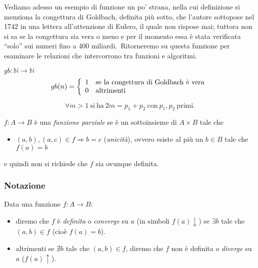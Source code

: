 \noindent Vediamo adesso un esempio di funzione un po' strana, nella cui definizione si menziona la congettura di Goldbach, definita più sotto, che l'autore sottopose nel 1742 in una lettera all'attenzione di Eulero, il quale non rispose mai; tuttora non si sa se la congettura sia vera o meno e per il momento essa è stata verificata ``solo'' sui numeri fino a 400 miliardi.\
Ritorneremo su questa funzione per esaminare le relazioni che intercorrono tra funzioni e algoritmi.

\begin{example}{\label{Goldbach}}
    $gb : \mathbb{N} \rightarrow \mathbb{N}$
    \[gb(n) = \left\{\begin{array}{l l}
            1 & \mathrm{se\ la\ congettura\ di\ Goldbach\ \grave{e}\ vera} \\
            0 & \mathrm{altrimenti}                                        \\
        \end{array}\right.\]
\end{example}

\begin{definition}
    \[\forall m > 1\ \mathrm{si\ ha}\ 2m = p_1 + p_2\ \mathrm{con}\ p_1, p_2\ \mathrm{primi}.\]
\end{definition}

\begin{definition}
    $f:A\rightarrow B$ è una \textit{funzione parziale} se è un sottoinsieme di $A \times B$ tale che
    \begin{itemize}
        \item $(a,b), (a,c) \in f \Rightarrow b = c$ (\textit{unicità}), ovvero esiste al più un $b \in B$ tale che $f(a)=b$
    \end{itemize}

    \noindent e quindi non si richiede che $f$ sia ovunque definita.
\end{definition}

\subsubsection{Notazione}

Data una funzione $f:A\rightarrow B$:

\begin{itemize}
    \item diremo che $f$ è \textit{definita} o \textit{converge} su $a$ (in simboli $f(a) \downarrow$) se $\exists b$ tale che $(a,b) \in f$ (cioè $f(a) = b$).
    \item altrimenti se $\nexists b$ tale che $(a,b)\in f$, diremo che $f$ non è definita o \textit{diverge} su $a$ ($f(a) \uparrow$).
\end{itemize}

